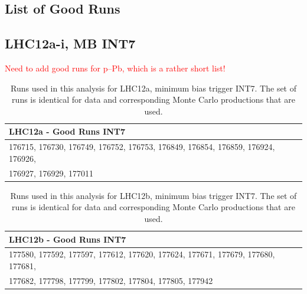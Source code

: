 \documentclass[ALICE]{ALICE_analysis_notes}
\newcommand{\pPb}{{\mbox{p--Pb}}\xspace}
\begin{document}
\begin{appendix}
\section{List of Good Runs}
\label{sec:goodRuns}
\subsection{LHC12a-i, MB INT7}
\label{subsec:goodRuns12}
\textcolor{red}{Need to add good runs for \pPb, which is a rather short list!}

\begin{table}[h!]
	\hspace*{-0.2cm}
	\small
	\centering
	\begin{tabular}{ll}  
	    \toprule
	    \textbf{LHC12a - Good Runs INT7} \\ \midrule
		176715, 176730, 176749, 176752, 176753, 176849, 176854, 176859, 176924, 176926, \\ \midrule
		176927, 176929, 177011 \\
		\bottomrule
	\end{tabular}
	\caption{Runs used in this analysis for LHC12a, minimum bias trigger INT7. The set of runs is identical for data and corresponding Monte Carlo productions that are used.}
	\label{tab:runs12a}
\end{table}
	
\begin{table}[h!]
	\hspace*{-0.2cm}
	\small
	\centering
	\begin{tabular}{ll}  
	    \toprule
	    \textbf{LHC12b - Good Runs INT7} \\ \midrule
		177580, 177592, 177597, 177612, 177620, 177624, 177671, 177679, 177680, 177681, \\ \midrule
		177682, 177798, 177799, 177802, 177804, 177805, 177942 \\
		\bottomrule
	\end{tabular}
	\caption{Runs used in this analysis for LHC12b, minimum bias trigger INT7. The set of runs is identical for data and corresponding Monte Carlo productions that are used.}
	\label{tab:runs12b}
\end{table}
	

\end{appendix}
\end{document}
